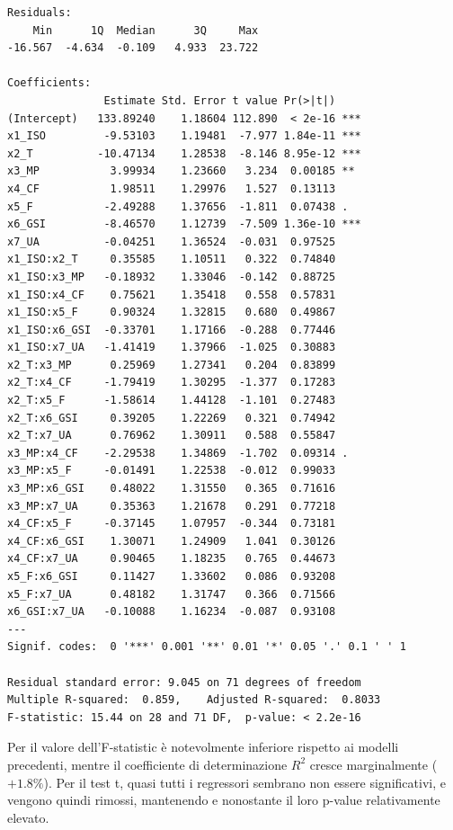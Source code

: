 \begin{lstlisting}[style=rconsole,caption={fit00}]
Residuals:
    Min      1Q  Median      3Q     Max
-16.567  -4.634  -0.109   4.933  23.722

Coefficients:
               Estimate Std. Error t value Pr(>|t|)
(Intercept)   133.89240    1.18604 112.890  < 2e-16 ***
x1_ISO         -9.53103    1.19481  -7.977 1.84e-11 ***
x2_T          -10.47134    1.28538  -8.146 8.95e-12 ***
x3_MP           3.99934    1.23660   3.234  0.00185 **
x4_CF           1.98511    1.29976   1.527  0.13113
x5_F           -2.49288    1.37656  -1.811  0.07438 .
x6_GSI         -8.46570    1.12739  -7.509 1.36e-10 ***
x7_UA          -0.04251    1.36524  -0.031  0.97525
x1_ISO:x2_T     0.35585    1.10511   0.322  0.74840
x1_ISO:x3_MP   -0.18932    1.33046  -0.142  0.88725
x1_ISO:x4_CF    0.75621    1.35418   0.558  0.57831
x1_ISO:x5_F     0.90324    1.32815   0.680  0.49867
x1_ISO:x6_GSI  -0.33701    1.17166  -0.288  0.77446
x1_ISO:x7_UA   -1.41419    1.37966  -1.025  0.30883
x2_T:x3_MP      0.25969    1.27341   0.204  0.83899
x2_T:x4_CF     -1.79419    1.30295  -1.377  0.17283
x2_T:x5_F      -1.58614    1.44128  -1.101  0.27483
x2_T:x6_GSI     0.39205    1.22269   0.321  0.74942
x2_T:x7_UA      0.76962    1.30911   0.588  0.55847
x3_MP:x4_CF    -2.29538    1.34869  -1.702  0.09314 .
x3_MP:x5_F     -0.01491    1.22538  -0.012  0.99033
x3_MP:x6_GSI    0.48022    1.31550   0.365  0.71616
x3_MP:x7_UA     0.35363    1.21678   0.291  0.77218
x4_CF:x5_F     -0.37145    1.07957  -0.344  0.73181
x4_CF:x6_GSI    1.30071    1.24909   1.041  0.30126
x4_CF:x7_UA     0.90465    1.18235   0.765  0.44673
x5_F:x6_GSI     0.11427    1.33602   0.086  0.93208
x5_F:x7_UA      0.48182    1.31747   0.366  0.71566
x6_GSI:x7_UA   -0.10088    1.16234  -0.087  0.93108
---
Signif. codes:  0 '***' 0.001 '**' 0.01 '*' 0.05 '.' 0.1 ' ' 1

Residual standard error: 9.045 on 71 degrees of freedom
Multiple R-squared:  0.859,    Adjusted R-squared:  0.8033
F-statistic: 15.44 on 28 and 71 DF,  p-value: < 2.2e-16
\end{lstlisting}

Per \texttt{} il valore dell'F-statistic è notevolmente inferiore rispetto ai modelli precedenti, mentre il coefficiente di determinazione $R^2$ cresce marginalmente ($+1.8\%$). Per il test t, quasi tutti i regressori sembrano non essere significativi, e vengono quindi rimossi, mantenendo \texttt{} e \texttt{} nonostante il loro p-value relativamente elevato.

